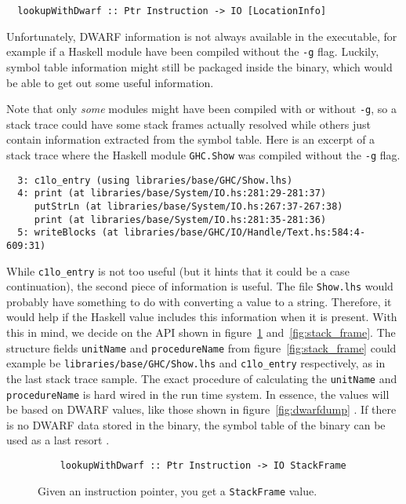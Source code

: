 \begin{verbatim}
  lookupWithDwarf :: Ptr Instruction -> IO [LocationInfo]
\end{verbatim}

Unfortunately, DWARF information is not always available in the
executable, for example if a Haskell module have been compiled without
the
\texttt{-g} flag. Luckily, symbol table information might still be
packaged inside the binary, which would be able to get out some useful
information.

Note that only \emph{some} modules might have been compiled
with or without \texttt{-g}, so a stack trace could have some stack frames actually
resolved while others just contain information extracted from the symbol
table. Here is an excerpt of a stack trace where the Haskell module \texttt{GHC.Show}
was compiled without the \texttt{-g} flag.

\begin{verbatim}
  3: c1lo_entry (using libraries/base/GHC/Show.lhs)
  4: print (at libraries/base/System/IO.hs:281:29-281:37)
     putStrLn (at libraries/base/System/IO.hs:267:37-267:38)
     print (at libraries/base/System/IO.hs:281:35-281:36)
  5: writeBlocks (at libraries/base/GHC/IO/Handle/Text.hs:584:4-609:31)
\end{verbatim}

While \texttt{c1lo\_entry} is not too useful (but it hints that it could be a
case continuation), the second piece of information is useful. The file
\texttt{Show.lhs} would probably have something to do with converting a value
to a string. Therefore, it would help if the Haskell value includes this
information when it is present. With this in mind, we decide on the API shown
in figure~\ref{fig:lookup_with_dwarf} and~\ref{fig:stack_frame}. The structure
fields \texttt{unitName} and \texttt{procedureName} from
figure~\ref{fig:stack_frame} could example be
\texttt{libraries/base/GHC/Show.lhs} and \texttt{c1lo\_entry} respectively, as
in the last stack trace sample. The exact procedure of calculating the
\texttt{unitName} and \texttt{procedureName} is hard wired in the run time
system. In essence, the values will be based on DWARF values, like those shown
in figure~\ref{fig:dwarfdump} \cite{github_dwarf_c_dwarf_findname}. If there is
no DWARF data stored in the binary, the symbol table of the binary can be used
as a last resort \cite{github_dwarf_c_symtab}.

\begin{figure}
\begin{mdframed}
  \begin{verbatim}
    lookupWithDwarf :: Ptr Instruction -> IO StackFrame
  \end{verbatim}
  \caption{Given an instruction pointer, you get a \texttt{StackFrame} value.}
  \label{fig:lookup_with_dwarf}
\end{mdframed}
\end{figure}

